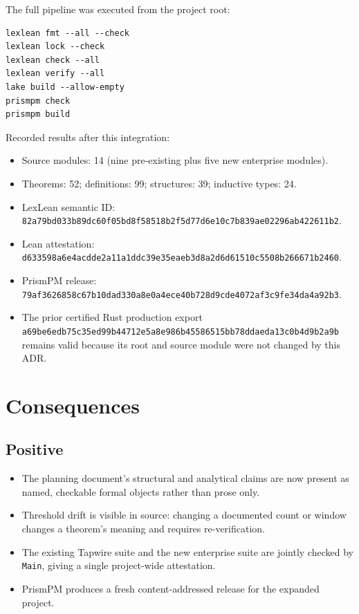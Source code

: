 \documentclass[11pt]{article}
\begin{document}
The full pipeline was executed from the project root:

\begin{lstlisting}
lexlean fmt --all --check
lexlean lock --check
lexlean check --all
lexlean verify --all
lake build --allow-empty
prismpm check
prismpm build
\end{lstlisting}

Recorded results after this integration:

\begin{itemize}
  \item Source modules: 14 (nine pre-existing plus five new enterprise modules).
  \item Theorems: 52; definitions: 99; structures: 39; inductive types: 24.
  \item LexLean semantic ID:
        \texttt{82a79bd033b89dc60f05bd8f58518b2f5d77d6e10c7b839ae02296ab422611b2}.
  \item Lean attestation:
        \texttt{d633598a6e4acdde2a11a1ddc39e35eaeb3d8a2d6d61510c5508b266671b2460}.
  \item PrismPM release:
        \texttt{79af3626858c67b10dad330a8e0a4ece40b728d9cde4072af3c9fe34da4a92b3}.
  \item The prior certified Rust production export
        \texttt{a69be6edb75c35ed99b44712e5a8e986b45586515bb78ddaeda13c0b4d9b2a9b} remains valid
        because its root and source module were not changed by this ADR.
\end{itemize}

\section{Consequences}

\subsection{Positive}

\begin{itemize}
  \item The planning document's structural and analytical claims are now present as named,
        checkable formal objects rather than prose only.
  \item Threshold drift is visible in source: changing a documented count or window changes a
        theorem's meaning and requires re-verification.
  \item The existing Tapwire suite and the new enterprise suite are jointly checked by
        \texttt{Main}, giving a single project-wide attestation.
  \item PrismPM produces a fresh content-addressed release for the expanded project.
\end{itemize}
\end{document}

